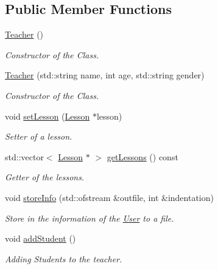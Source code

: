 \subsection*{Public Member Functions}
\begin{DoxyCompactItemize}
\item 
\mbox{\label{class_teacher_a0d09b151c46e2abb647a2ae40cc5510c}} 
\mbox{\hyperlink{class_teacher_a0d09b151c46e2abb647a2ae40cc5510c}{Teacher}} ()
\begin{DoxyCompactList}\small\item\em Constructor of the Class. \end{DoxyCompactList}\item 
\mbox{\hyperlink{class_teacher_adb308468e6ed8bbbffaba9cbf1ae646e}{Teacher}} (std\+::string name, int age, std\+::string gender)
\begin{DoxyCompactList}\small\item\em Constructor of the Class. \end{DoxyCompactList}\item 
void \mbox{\hyperlink{class_teacher_aec95be6f77dc2b692627a6f4a5385971}{set\+Lesson}} (\mbox{\hyperlink{class_lesson}{Lesson}} $\ast$lesson)
\begin{DoxyCompactList}\small\item\em Setter of a lesson. \end{DoxyCompactList}\item 
std\+::vector$<$ \mbox{\hyperlink{class_lesson}{Lesson}} $\ast$ $>$ \mbox{\hyperlink{class_teacher_ab81c1d9f42a315f11d91a8247a943612}{get\+Lessons}} () const
\begin{DoxyCompactList}\small\item\em Getter of the lessons. \end{DoxyCompactList}\item 
void \mbox{\hyperlink{class_teacher_a2ece0d60fa7ec4aaf93333aa0be0d25f}{store\+Info}} (std\+::ofstream \&outfile, int \&indentation)
\begin{DoxyCompactList}\small\item\em Store in the information of the \mbox{\hyperlink{class_user}{User}} to a file. \end{DoxyCompactList}\item 
\mbox{\label{class_teacher_afd85dc703e8ddad28e298c1dcc697ee4}} 
void \mbox{\hyperlink{class_teacher_afd85dc703e8ddad28e298c1dcc697ee4}{add\+Student}} ()
\begin{DoxyCompactList}\small\item\em Adding Students to the teacher. \end{DoxyCompactList}\item 

\end{DoxyCompactItemize}
